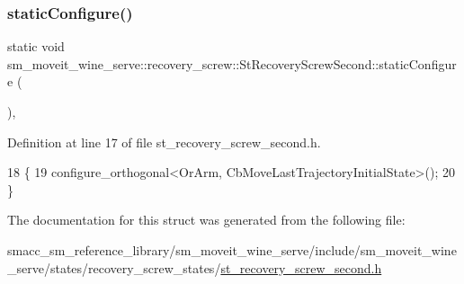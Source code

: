 \subsubsection{\texorpdfstring{static\+Configure()}{staticConfigure()}}
{\footnotesize\ttfamily static void sm\+\_\+moveit\+\_\+wine\+\_\+serve\+::recovery\+\_\+screw\+::\+St\+Recovery\+Screw\+Second\+::static\+Configure (\begin{DoxyParamCaption}{ }\end{DoxyParamCaption})\hspace{0.3cm}{\ttfamily [inline]}, {\ttfamily [static]}}



Definition at line 17 of file st\+\_\+recovery\+\_\+screw\+\_\+second.\+h.


\begin{DoxyCode}
18             \{
19                 configure\_orthogonal<OrArm, CbMoveLastTrajectoryInitialState>();
20             \}
\end{DoxyCode}


The documentation for this struct was generated from the following file\+:\begin{DoxyCompactItemize}
\item 
smacc\+\_\+sm\+\_\+reference\+\_\+library/sm\+\_\+moveit\+\_\+wine\+\_\+serve/include/sm\+\_\+moveit\+\_\+wine\+\_\+serve/states/recovery\+\_\+screw\+\_\+states/\hyperlink{sm__moveit__wine__serve_2include_2sm__moveit__wine__serve_2states_2recovery__screw__states_2st__recovery__screw__second_8h}{st\+\_\+recovery\+\_\+screw\+\_\+second.\+h}\end{DoxyCompactItemize}
